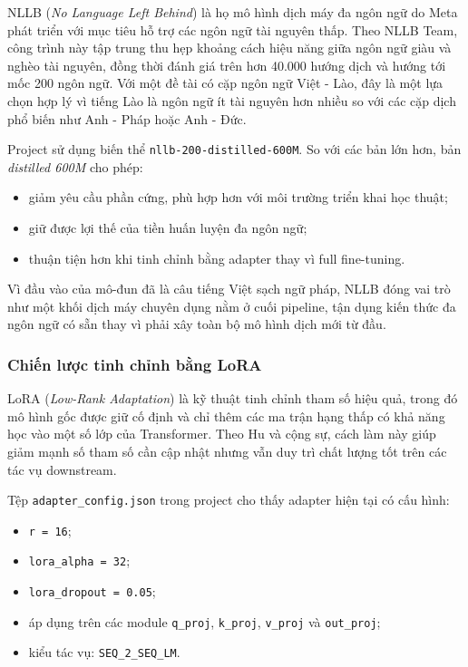 NLLB (\textit{No Language Left Behind}) là họ mô hình dịch máy đa ngôn ngữ do Meta
phát triển với mục tiêu hỗ trợ các ngôn ngữ tài nguyên thấp. Theo NLLB Team, công trình
này tập trung thu hẹp khoảng cách hiệu năng giữa ngôn ngữ giàu và nghèo tài nguyên, đồng
thời đánh giá trên hơn 40.000 hướng dịch và hướng tới mốc 200 ngôn ngữ. Với một
đề tài có cặp ngôn ngữ Việt - Lào, đây là một lựa chọn hợp lý vì tiếng Lào là ngôn ngữ ít
tài nguyên hơn nhiều so với các cặp dịch phổ biến như Anh - Pháp hoặc Anh - Đức.

Project sử dụng biến thể \texttt{nllb-200-distilled-600M}. So với các bản lớn hơn, bản
\textit{distilled 600M} cho phép:
\begin{itemize}
    \item giảm yêu cầu phần cứng, phù hợp hơn với môi trường triển khai học thuật;
    \item giữ được lợi thế của tiền huấn luyện đa ngôn ngữ;
    \item thuận tiện hơn khi tinh chỉnh bằng adapter thay vì full fine-tuning.
\end{itemize}

Vì đầu vào của mô-đun đã là câu tiếng Việt sạch ngữ pháp, NLLB đóng vai trò như một
khối dịch máy chuyên dụng nằm ở cuối pipeline, tận dụng kiến thức đa ngôn ngữ có sẵn
thay vì phải xây toàn bộ mô hình dịch mới từ đầu.

\subsubsection{Chiến lược tinh chỉnh bằng LoRA}

LoRA (\textit{Low-Rank Adaptation}) là kỹ thuật tinh chỉnh tham số hiệu quả, trong đó mô
hình gốc được giữ cố định và chỉ thêm các ma trận hạng thấp có khả năng học vào một số
lớp của Transformer. Theo Hu và cộng sự, cách làm này giúp giảm mạnh số tham số cần
cập nhật nhưng vẫn duy trì chất lượng tốt trên các tác vụ downstream.

Tệp \texttt{adapter\_config.json} trong project cho thấy adapter hiện tại có cấu hình:
\begin{itemize}
    \item \texttt{r = 16};
    \item \texttt{lora\_alpha = 32};
    \item \texttt{lora\_dropout = 0.05};
    \item áp dụng trên các module \texttt{q\_proj}, \texttt{k\_proj},
    \texttt{v\_proj} và \texttt{out\_proj};
    \item kiểu tác vụ: \texttt{SEQ\_2\_SEQ\_LM}.
\end{itemize}

